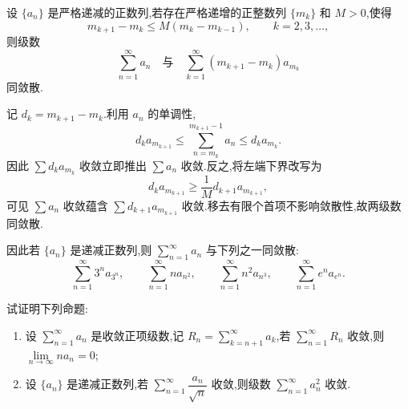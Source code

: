 \begin{example}
    设 $\{a_n\}$ 是严格递减的正数列,若存在严格递增的正整数列 $\{m_k\}$ 和 $M>0$,使得
    \[
        m_{k+1}-m_k\leq M(m_k-m_{k-1}),
        \qquad k=2,3,\ldots,
    \]
    则级数
    \[
        \displaystyle\sum\limits_{n=1}^{\infty}a_n
        \quad\text{与}\quad
        \sum\limits_{k=1}^{\infty}(m_{k+1}-m_k)a_{m_k}
    \]
    同敛散.
\end{example}
\exampleblank

\begin{solution}
    记 $d_k=m_{k+1}-m_k$.利用 $a_n$ 的单调性,
    \[
        d_ka_{m_{k+1}}
        \leq\sum\limits_{n=m_k}^{m_{k+1}-1}a_n
        \leq d_ka_{m_k}.
    \]
    因此 $\displaystyle \sum d_ka_{m_k}$ 收敛立即推出 $\displaystyle \sum a_n$ 收敛.反之,将左端下界改写为
    \[
        d_ka_{m_{k+1}}
        \geq\dfrac{1}{M} d_{k+1}a_{m_{k+1}},
    \]
    可见 $\displaystyle \sum a_n$ 收敛蕴含 $\displaystyle \sum d_{k+1}a_{m_{k+1}}$ 收敛.移去有限个首项不影响敛散性,故两级数同敛散.
\end{solution}

\begin{remark}
    因此若 $\{a_n\}$ 是递减正数列,则 $\displaystyle\sum\limits_{n=1}^{\infty}a_n$ 与下列之一同敛散:
    \[
        \displaystyle\sum\limits_{n=1}^{\infty}3^na_{3^n},
        \qquad
        \sum\limits_{n=1}^{\infty}na_{n^2},
        \qquad
        \sum\limits_{n=1}^{\infty}n^2a_{n^3},
        \qquad
        \sum\limits_{n=1}^{\infty}e^na_{e^n}.
    \]
\end{remark}

\begin{example}
    试证明下列命题:
    \begin{enumerate}
        \item 设 $\displaystyle\sum\limits_{n=1}^{\infty}a_n$ 是收敛正项级数,记 $\displaystyle R_n=\sum\limits_{k=n+1}^{\infty}a_k$,若 $\displaystyle\sum\limits_{n=1}^{\infty}R_n$ 收敛,则 $\displaystyle\lim\limits_{n\to\infty}na_n=0$;
        \item 设 $\{a_n\}$ 是递减正数列,若 $\displaystyle\sum\limits_{n=1}^{\infty}\dfrac{a_n}{\sqrt n}$ 收敛,则级数 $\displaystyle\sum\limits_{n=1}^{\infty}a_n^2$ 收敛.
    \end{enumerate}
\end{example}
\exampleblank

